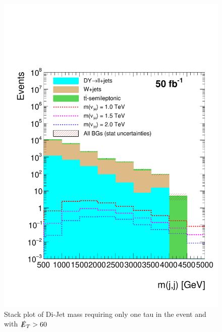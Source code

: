\begin{figure}[H]
\centering
\includegraphics[width=\linewidth]{StackPlots/mjj_1Tau_met60_50ifb.pdf}
\caption{Stack plot of Di-Jet mass requiring only one tau in the event and with $\slashed{E}_{T} > 60$}
\label{fig: mjj1tauMet60}
\end{figure}




